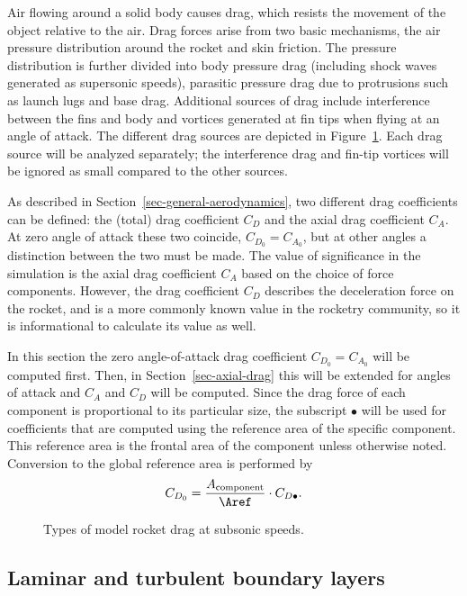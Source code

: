 Air flowing around a solid body causes drag, which resists the
movement of the object relative to the air.  Drag forces arise from
two basic mechanisms, the air pressure distribution around the rocket
and skin friction.  The pressure distribution is further divided into
body pressure drag (including shock waves generated as supersonic
speeds), parasitic pressure drag due to protrusions such as launch
lugs and base drag.  Additional sources of drag include interference
between the fins and body and vortices generated at fin tips when
flying at an angle of attack.  The different drag sources are depicted
in Figure~\ref{fig-drag-components}.  Each drag source will be analyzed
separately; the interference drag and fin-tip vortices will be
ignored as small compared to the other sources.

As described in Section~\ref{sec-general-aerodynamics}, two different
drag coefficients can be defined: the (total) drag coefficient $C_D$
and the axial drag coefficient $C_A$.  At zero angle of attack these
two coincide, $C_{D_0} = C_{A_0}$, but at other angles a distinction
between the two must be made.  The value of significance in the
simulation is the axial drag coefficient $C_A$ based on the choice of
force components.  However, the drag coefficient $C_D$ describes the
deceleration force on the rocket, and is a more commonly known value
in the rocketry community, so it is informational to calculate its
value as well.

In this section the zero angle-of-attack drag coefficient
$C_{D_0} = C_{A_0}$ will be computed first.  Then, in
Section~\ref{sec-axial-drag} this will be extended for angles of
attack and $C_A$ and $C_D$ will be computed.  Since the drag force of
each component is proportional to its particular size, the subscript
$\bullet$ will be used for coefficients that are computed using the
reference area of the specific component.  This reference area is the
frontal area of the component unless otherwise noted.  Conversion to
the global reference area is performed by
%
\begin{equation}
C_{D_0} = \frac{A_{\rm component}}{\Aref} \cdot C_{D\bullet}.
\end{equation}


\begin{figure}
\centering
{}
\caption{Types of model rocket drag at subsonic speeds.}
\label{fig-drag-components}
\end{figure}


\subsection{Laminar and turbulent boundary layers}

